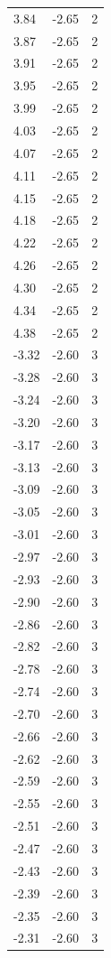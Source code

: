 \begin{longtable}{lrr}
  3.84 & -2.65 & 2 \\
  3.87 & -2.65 & 2 \\
  3.91 & -2.65 & 2 \\
  3.95 & -2.65 & 2 \\
  3.99 & -2.65 & 2 \\
  4.03 & -2.65 & 2 \\
  4.07 & -2.65 & 2 \\
  4.11 & -2.65 & 2 \\
  4.15 & -2.65 & 2 \\
  4.18 & -2.65 & 2 \\
  4.22 & -2.65 & 2 \\
  4.26 & -2.65 & 2 \\
  4.30 & -2.65 & 2 \\
  4.34 & -2.65 & 2 \\
  4.38 & -2.65 & 2 \\
  -3.32 & -2.60 & 3 \\
  -3.28 & -2.60 & 3 \\
  -3.24 & -2.60 & 3 \\
  -3.20 & -2.60 & 3 \\
  -3.17 & -2.60 & 3 \\
  -3.13 & -2.60 & 3 \\
  -3.09 & -2.60 & 3 \\
  -3.05 & -2.60 & 3 \\
  -3.01 & -2.60 & 3 \\
  -2.97 & -2.60 & 3 \\
  -2.93 & -2.60 & 3 \\
  -2.90 & -2.60 & 3 \\
  -2.86 & -2.60 & 3 \\
  -2.82 & -2.60 & 3 \\
  -2.78 & -2.60 & 3 \\
  -2.74 & -2.60 & 3 \\
  -2.70 & -2.60 & 3 \\
  -2.66 & -2.60 & 3 \\
  -2.62 & -2.60 & 3 \\
  -2.59 & -2.60 & 3 \\
  -2.55 & -2.60 & 3 \\
  -2.51 & -2.60 & 3 \\
  -2.47 & -2.60 & 3 \\
  -2.43 & -2.60 & 3 \\
  -2.39 & -2.60 & 3 \\
  -2.35 & -2.60 & 3 \\
  -2.31 & -2.60 & 3 \\

\end{longtable}
